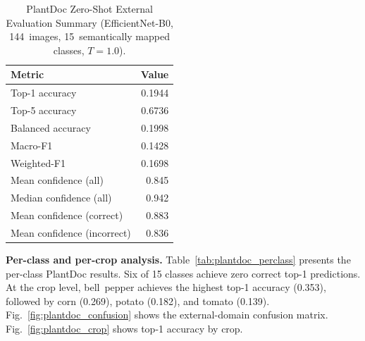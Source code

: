 \documentclass[conference]{IEEEtran}
\begin{document}
\begin{table}[!t]
\caption{PlantDoc Zero-Shot External Evaluation Summary
(EfficientNet-B0, 144~images, 15~semantically mapped classes,
$T\!=\!1.0$).}
\label{tab:plantdoc_overall}
\centering
\small
\begin{tabular}{lr}
\toprule
\textbf{Metric} & \textbf{Value} \\
\midrule
Top-1 accuracy & 0.1944 \\
Top-5 accuracy & 0.6736 \\
Balanced accuracy & 0.1998 \\
Macro-F1 & 0.1428 \\
Weighted-F1 & 0.1698 \\
Mean confidence (all) & 0.845 \\
Median confidence (all) & 0.942 \\
Mean confidence (correct) & 0.883 \\
Mean confidence (incorrect) & 0.836 \\
\bottomrule
\end{tabular}
\end{table}

\textbf{Per-class and per-crop analysis.}
Table~\ref{tab:plantdoc_perclass} presents the per-class PlantDoc
results. Six of 15 classes achieve zero correct top-1 predictions.
At the crop level, bell~pepper achieves the highest top-1 accuracy
(0.353), followed by corn (0.269), potato (0.182), and tomato (0.139).
Fig.~\ref{fig:plantdoc_confusion} shows the external-domain confusion
matrix. Fig.~\ref{fig:plantdoc_crop} shows top-1 accuracy by crop.
\end{document}
